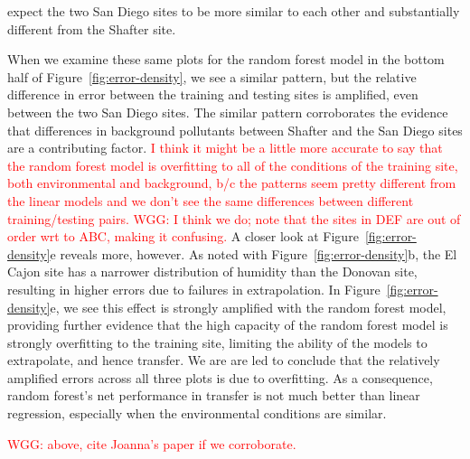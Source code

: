 \documentclass[journal abbreviation, manuscript]{copernicus}
\newcommand\todo[1]{\textcolor{red}{#1}}
\newcommand{\textus}[1]{$_{\text{#1}}$}
\begin{document}
expect the two San Diego sites to be more similar to each other and substantially different from the Shafter site.

When we examine these same plots for the random forest model in the bottom half of Figure~\ref{fig:error-density}, we see a similar pattern, but the relative difference in error between the training and testing sites is amplified, even between the two San Diego sites.  The similar pattern corroborates the evidence that differences in background pollutants between Shafter and the San Diego sites are a contributing factor. \todo{I think it might be a little more accurate to say that the random forest model is overfitting to all of the conditions of the training site, both environmental and background, b/c the patterns seem pretty different from the linear models and we don't see the same differences between different training/testing pairs.  WGG: I think we do; note that the sites in DEF are out of order wrt to ABC, making it confusing.}   A closer look at Figure~\ref{fig:error-density}e reveals more, however.  As noted with Figure~\ref{fig:error-density}b, the El Cajon site has a narrower distribution of humidity than the Donovan site, resulting in higher errors due to failures in extrapolation.  In Figure~\ref{fig:error-density}e, we see this effect is strongly amplified with the random forest model, providing further evidence that the high capacity of the random forest model is strongly overfitting to the training site, limiting the ability of the models to extrapolate, and hence transfer.  We are are led to conclude that the relatively amplified errors across all three plots is due to overfitting.  As a consequence, random forest's net performance in transfer is not much better than linear regression, especially when the environmental conditions are similar.

\todo{WGG: above, cite Joanna's paper if we corroborate.}

\end{document}
